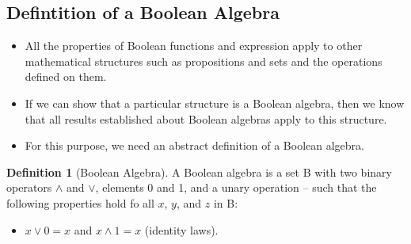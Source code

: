 \documentclass{article}
\theoremstyle{definition}
\newtheorem{definition}{Definition}[section]
\begin{document}
\subsection{Defintition of a Boolean Algebra}
\begin{itemize}
    \item All the properties of Boolean functions and expression
        apply to other mathematical structures such as propositions
        and sets and the operations defined on them.
    \item If we can show that a particular structure is a Boolean algebra,
        then we know that all results established about Boolean algebras apply
        to this structure.
    \item For this purpose, we need an abstract definition of a Boolean algebra.
\end{itemize}
\begin{definition}[Boolean Algebra] A Boolean algebra is a set B with two binary operators
    $\land$ and $\lor$, elements 0 and 1, and a unary operation --
    such that the following properties hold fo all $x$, $y$, and $z$ in
    B:
    \begin{itemize}
        \item $x \lor 0 = x$ and $x \land 1 = x$ (identity laws).
    \end{itemize}
\end{definition}
\end{document}
